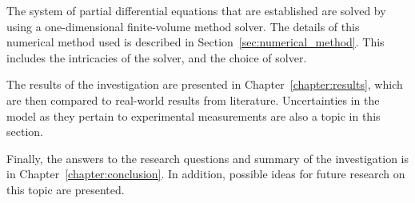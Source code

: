 The system of partial differential equations that are established are solved by using a one-dimensional finite-volume method solver.
The details of this numerical method used is described in Section~\ref{sec:numerical_method}.
This includes the intricacies of the solver, and the choice of solver.

The results of the investigation are presented in Chapter~\ref{chapter:results}, which are then compared to real-world results from literature.
Uncertainties in the model as they pertain to experimental measurements are also a topic in this section.

Finally, the answers to the research questions and summary of the investigation is in Chapter~\ref{chapter:conclusion}.
In addition, possible ideas for future research on this topic are presented.

